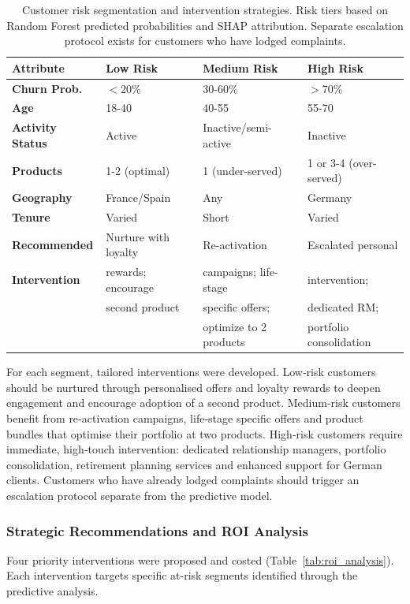 \documentclass[12pt]{article}
\begin{document}
\begin{table}[H]
\centering
\small
\caption{Customer risk segmentation and intervention strategies. Risk tiers based on Random Forest predicted probabilities and SHAP attribution. Separate escalation protocol exists for customers who have lodged complaints.}
\label{tab:risk_profiles}
\begin{tabular}{p{3.5cm}p{3.5cm}p{3.5cm}p{3.5cm}}
\toprule
\textbf{Attribute} & \textbf{Low Risk} & \textbf{Medium Risk} & \textbf{High Risk} \\
\midrule
\textbf{Churn Prob.} & $<$20\% & 30-60\% & $>$70\% \\
\textbf{Age} & 18-40 & 40-55 & 55-70 \\
\textbf{Activity Status} & Active & Inactive/semi-active & Inactive \\
\textbf{Products} & 1-2 (optimal) & 1 (under-served) & 1 or 3-4 (over-served) \\
\textbf{Geography} & France/Spain & Any & Germany \\
\textbf{Tenure} & Varied & Short & Varied \\
\midrule
\textbf{Recommended} & Nurture with loyalty & Re-activation & Escalated personal \\
\textbf{Intervention} & rewards; encourage & campaigns; life-stage & intervention; \\
& second product & specific offers; & dedicated RM; \\
& & optimize to 2 products & portfolio consolidation \\
\bottomrule
\end{tabular}
\end{table}

For each segment, tailored interventions were developed.  Low‑risk customers should be nurtured through personalised offers and loyalty rewards to deepen engagement and encourage adoption of a second product.  Medium‑risk customers benefit from re‑activation campaigns, life‑stage specific offers and product bundles that optimise their portfolio at two products.  High‑risk customers require immediate, high‑touch intervention: dedicated relationship managers, portfolio consolidation, retirement planning services and enhanced support for German clients.  Customers who have already lodged complaints should trigger an escalation protocol separate from the predictive model.

\subsubsection{Strategic Recommendations and ROI Analysis}
Four priority interventions were proposed and costed (Table~\ref{tab:roi_analysis}).  Each intervention targets specific at-risk segments identified through the predictive analysis.
\end{document}
